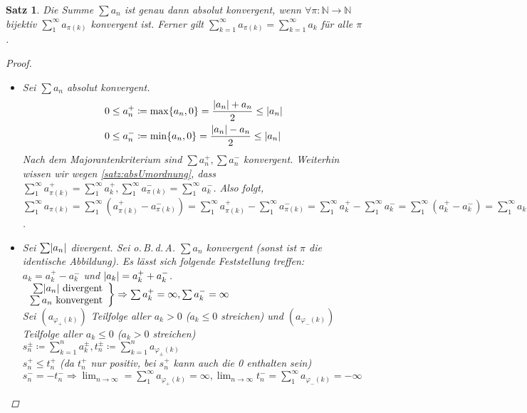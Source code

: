 \documentclass[ngerman,titlepage,twoside, parskip=half*]{scrreprt}
\newcommand*{\N}{\mathbb{N}}
\theoremstyle{break}
\newtheorem{theorem}{Satz}[section]
\theoremstyle{nonumberbreak}
\newtheorem{proof}{Beweis:}
\DeclarePairedDelimiter{\abs}{\lvert}{\rvert}
\begin{document}
\begin{theorem}\label{satz:absUmordnung}
  Die Summe $\sum a_n$ ist genau dann absolut konvergent, wenn $\forall \pi
  \colon\N \rightarrow \N$ bijektiv $\sum_1^\infty a_{\pi(k)}$ konvergent ist.
  Ferner gilt $\sum_{k=1}^{\infty} a_{\pi(k)}= \sum_{k=1}^{\infty} a_{k}$ für
  alle $\pi$.
  \begin{proof}
    \begin{itemize}
     \item["`$\Rightarrow$"'] Sei $\sum a_n$ absolut konvergent.
      \begin{align*}
	0 &\leq a_n^+\coloneqq\max\{a_n,0\} = \frac{\abs{a_n}+a_n}{2}\leq
	   \abs{a_n}\\
        0 &\leq a_n^-\coloneqq\min\{a_n,0\} = \frac{\abs{a_n}-a_n}{2}\leq
	   \abs{a_n}
      \end{align*}
      Nach dem Majorantenkriterium sind $\sum a_n^+, \sum a_n^-$ konvergent.
      Weiterhin wissen wir wegen \autoref{satz:absUmordnung}, dass
      $\sum_1^\infty a_{\pi(k)}^+ =\sum_1^\infty a_k^+, \sum_1^\infty
      a_{\pi(k)}^- =\sum_1^\infty a_k^-$. Also folgt, $\sum_1^\infty
      a_{\pi(k)} =\sum_1^\infty (a_{\pi(k)}^+-a_{\pi(k)}^-) =\sum_1^\infty
      a_{\pi(k)}^+ - \sum_1^\infty a_{\pi(k)}^- =\sum_1^\infty a_k^+
      -\sum_1^\infty a_k^- =\sum_1^\infty (a_k^+ -a_k^-) =\sum_1^\infty a_k$.
  \item["`$\Leftarrow$"'] Sei $\sum \abs{a_n}$ divergent. Sei o.\,B.\,d.\,A.
      $\sum a_n$ konvergent (sonst ist $\pi$ die identische Abbildung). Es
      lässt sich folgende Feststellung treffen: $a_k =a_k^+ -a_k^-$ und
      $\abs{a_k}=a_k^+ +a_k^-$.
    $\left.\begin{array}{rcl}
      \sum \abs{a_n} \text{ divergent}\\
      \sum a_n \text{ konvergent}
    \end{array}\right\}\Rightarrow \sum a_k^+=\infty, \sum a_k^-=\infty$\\
    Sei $(a_{\varphi_+(k)})$ Teilfolge aller $a_k>0$ ($a_k\leq 0$ streichen) und $(a_{\varphi_-(k)})$ Teilfolge aller
    $a_k\leq 0$ ($a_k>0$ streichen)\\
    $s_n^\pm\coloneqq\sum_{k=1}^n a_k^\pm, t_n^\pm\coloneqq\sum_{k=1}^n
  a_{\varphi_\pm(k)}$\\
    $s_n^+\leq t_n^+$ (da $t_n^+$ nur positiv, bei $s_n^+$ kann auch die 0 enthalten sein)\\
    $s_n^-=-t_n^- \Rightarrow \lim_{n\rightarrow \infty}=\sum_1^\infty a_{\varphi_+(k)}=\infty, \lim_{n\rightarrow \infty}
    t_n^-=\sum_1^\infty a_{\varphi_-(k)}=-\infty$ 
\end{itemize}
  \end{proof}
\end{theorem}
\end{document}
